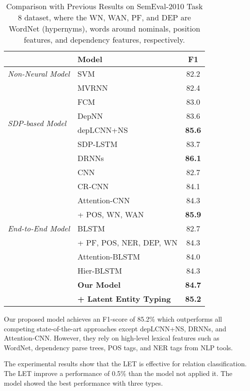 \documentclass[twoside,leqno,twocolumn]{article}
\begin{document}
\begin{table}[!ht]
\begin{center}
\renewcommand{\arraystretch}{1.1}   
\begin{tabular}{m{1.8cm} p{4.7cm} c}
& \textbf{Model} & \textbf{F1} \\ 
\hline\hline
\textit{Non-Neural Model}\centering
& SVM & 82.2 \\
\hline
\multirow{6}{1.8cm}{\textit{SDP-based Model}\centering} 
& MVRNN & 82.4 \\ \cline{2-3}
& FCM & 83.0 \\ \cline{2-3}
& DepNN & 83.6 \\ \cline{2-3}
& depLCNN+NS & \textbf{85.6} \\ \cline{2-3}
& SDP-LSTM & 83.7 \\ \cline{2-3}
& DRNNs & \textbf{86.1} \\ 
\hline
\multirow{9}{1.8cm}{\textit{End-to-End Model}\centering}
& CNN & 82.7 \\ \cline{2-3}
& CR-CNN & 84.1 \\ \cline{2-3}
& Attention-CNN & 84.3 \\
& + POS, WN, WAN & \textbf{85.9} \\ \cline{2-3}
& BLSTM & 82.7 \\
& + PF, POS, NER, DEP, WN & 84.3 \\ \cline{2-3}
& Attention-BLSTM & 84.0 \\ \cline{2-3}
& Hier-BLSTM & 84.3 \\ 
\hline
& \textbf{Our Model} & \textbf{84.7} \\
& \textbf{+ Latent Entity Typing} & \textbf{85.2} \\ \hline
\end{tabular}
\end{center}
\caption{Comparison with Previous Results on SemEval-2010 Task 8 dataset, where the WN, WAN, PF, and DEP are WordNet (hypernyms), words around nominals, position features, and dependency features, respectively.}
\label{tb:2}
\end{table}
Our proposed model achieves an F1-score of 85.2\% which outperforms all competing state-of-the-art approaches except depLCNN+NS, DRNNs, and Attention-CNN.
However, they rely on high-level lexical features such as WordNet, dependency parse trees, POS tags, and NER tags from NLP tools.

The experimental results show that the LET is effective for relation classification. 
The LET improve a performance of 0.5\% than the model not applied it. The model showed the best performance with three types.
\end{document}
